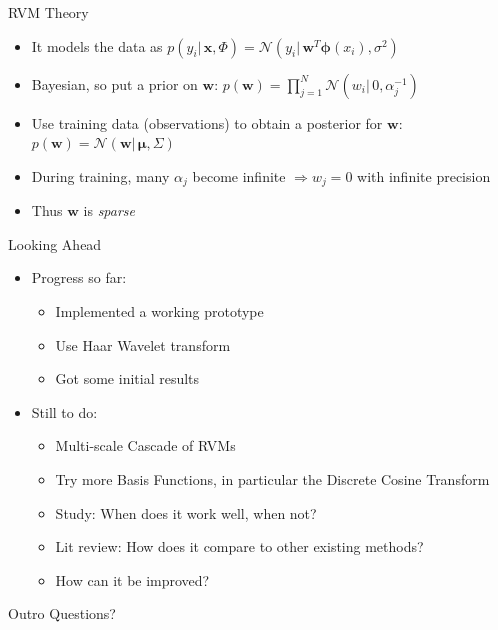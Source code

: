 \documentclass[xcolor=table]{beamer}
\numberwithin{equation}{section}
\let\bs\boldsymbol
\begin{document}
\begin{frame}{RVM Theory}
\begin{itemize}
\item It models the data as $p(y_i|\,\bs x, \Phi) = \mathcal{N}(y_i|\,\bs w^T \bs \phi(x_i),\sigma^2)$ 
\item Bayesian, so put a prior on $\bs w$: $p(\bs w) = \prod_{j=1}^N \mathcal{N}(w_i|\,0,\alpha_j^{-1})$
\item Use training data (observations) to obtain a posterior for $\bs w$: $p(\bs w) = \mathcal{N}(\bs w|\,\bs\mu,\Sigma)$
\item During training, many $\alpha_j$ become infinite $\Rightarrow w_j = 0$ with infinite precision
\item Thus $\bs w$ is \emph{sparse}
\end{itemize}
\end{frame}

\begin{frame}{Looking Ahead}
\begin{itemize}
\item Progress so far:
\begin{itemize}
\item Implemented a working prototype
\item Use Haar Wavelet transform
\item Got some initial results
\end{itemize}
\item Still to do:
\begin{itemize}
\item Multi-scale Cascade of RVMs
\item Try more Basis Functions, in particular the Discrete Cosine Transform
\item Study: When does it work well, when not?
\item Lit review: How does it compare to other existing methods?
\item How can it be improved?
\end{itemize}
\end{itemize}
\end{frame}

\begin{frame}{Outro}
\hspace{2in}Questions?
\end{frame}
\end{document}
